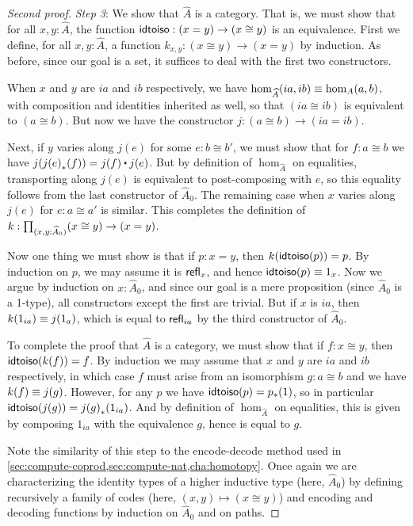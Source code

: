 \begin{proof}[Second proof]
  \mentalpause

  \emph{Step 3}: We show that $\widehat A$ is a category.
  That is, we must show that for all $x,y:\widehat A$, the function $\mathsf{idtoiso}:(x=y) \to (x\cong y)$ is an equivalence.
  First we define, for all $x,y:\widehat A$, a function $k_{x,y}:(x\cong y) \to (x=y)$ by induction.
  As before, since our goal is a set, it suffices to deal with the first two constructors.

  When $x$ and $y$ are $ia$ and $ib$ respectively, we have $\hom_{\widehat A}(ia,ib)\equiv \hom_A(a,b)$, with composition and identities inherited as well, so that $(ia\cong ib)$ is equivalent to $(a\cong b)$.
  But now we have the constructor $j:(a\cong b) \to (ia=ib)$.

  Next, if $y$ varies along $j(e)$ for some $e:b\cong b'$, we must show that for $f:a\cong b$ we have $j(\trans{j(e)}{f}) = j(f) \ct j(e)$.
  But by definition of $\hom_{\widehat A}$ on equalities, transporting along $j(e)$ is equivalent to post-composing with $e$, so this equality follows from the last constructor of $\widehat A_0$.
  The remaining case when $x$ varies along $j(e)$ for $e:a\cong a'$ is similar.
  This completes the definition of $k:\prd{x,y:\widehat A_0} (x\cong y) \to (x=y)$.

  Now one thing we must show is that if $p:x=y$, then $k(\mathsf{idtoiso}(p))=p$.
  By induction on $p$, we may assume it is $\mathsf{refl}_{x}$, and hence $\mathsf{idtoiso}(p)\equiv 1_x$.
  Now we argue by induction on $x:\widehat A_0$, and since our goal is a mere proposition (since $\widehat A_0$ is a 1-type), all constructors except the first are trivial.
  But if $x$ is $ia$, then $k(1_{ia}) \equiv j(1_a)$, which is equal to $\mathsf{refl}_{ia}$ by the third constructor of $\widehat A_0$.

  To complete the proof that $\widehat A$ is a category, we must show that if $f:x\cong y$, then $\mathsf{idtoiso}(k(f))=f$.
  By induction we may assume that $x$ and $y$ are $ia$ and $ib$ respectively, in which case $f$ must arise from an isomorphism $g:a\cong b$ and we have $k(f)\equiv j(g)$.
  However, for any $p$ we have $\mathsf{idtoiso}(p) = {p}_{*}\mathopen{}\left({1}\right)\mathclose{}$, so in particular $\mathsf{idtoiso} (j(g)) = {j(g)}_{*}\mathopen{}\left({1_{ia}}\right)\mathclose{}$.
  And by definition of $\hom_{\widehat A}$ on equalities, this is given by composing $1_{ia}$ with the equivalence $g$, hence is equal to $g$.

  Note the similarity of this step to the encode-decode method used in \cref{sec:compute-coprod,sec:compute-nat,cha:homotopy}.
  Once again we are characterizing the identity types of a higher inductive type (here, $\widehat A_0$) by defining recursively a family of codes (here, $(x,y)\mapsto (x\cong y)$) and encoding and decoding functions by induction on $\widehat A_0$ and on paths.


\end{proof}
